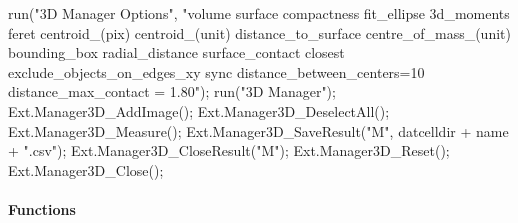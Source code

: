 \documentclass[10pt, b5paper, singlespacinge, twoside]{reedthesis} %
\newenvironment{Shaded}{}{}
\newcommand{\FunctionTok}[1]{#1}
\newcommand{\NormalTok}[1]{#1}
\newcommand{\SpecialCharTok}[1]{#1}
\newcommand{\StringTok}[1]{#1}
\theoremstyle{definition}
\theoremstyle{definition}
\theoremstyle{definition}
\theoremstyle{remark}
\begin{document}
\scriptsize
\begin{Shaded}
\begin{Highlighting}[numbers=left,,]
\FunctionTok{run}\NormalTok{(}\StringTok{"3D Manager Options"}\NormalTok{, }\StringTok{"volume surface compactness fit\_ellipse 3d\_moments }
\StringTok{    feret centroid\_(pix) centroid\_(unit) distance\_to\_surface centre\_of\_mass\_(unit) }
\StringTok{    bounding\_box radial\_distance surface\_contact closest exclude\_objects\_on\_edges\_xy }
\StringTok{    sync distance\_between\_centers=10 distance\_max\_contact = 1.80"}\NormalTok{);}
\FunctionTok{run}\NormalTok{(}\StringTok{"3D Manager"}\NormalTok{);}
\FunctionTok{Ext.Manager3D\_AddImage}\NormalTok{();}
\FunctionTok{Ext.Manager3D\_DeselectAll}\NormalTok{();}
\FunctionTok{Ext.Manager3D\_Measure}\NormalTok{();}
\FunctionTok{Ext.Manager3D\_SaveResult}\NormalTok{(}\StringTok{"M"}\NormalTok{, datcelldir }\SpecialCharTok{+}\NormalTok{ name }\SpecialCharTok{+} \StringTok{".csv"}\NormalTok{);}
\FunctionTok{Ext.Manager3D\_CloseResult}\NormalTok{(}\StringTok{"M"}\NormalTok{);}
\FunctionTok{Ext.Manager3D\_Reset}\NormalTok{();}
\FunctionTok{Ext.Manager3D\_Close}\NormalTok{();}
\end{Highlighting}
\end{Shaded}
\normalsize

\hypertarget{functions}{%
\paragraph{Functions}\label{functions}}
\end{document}
